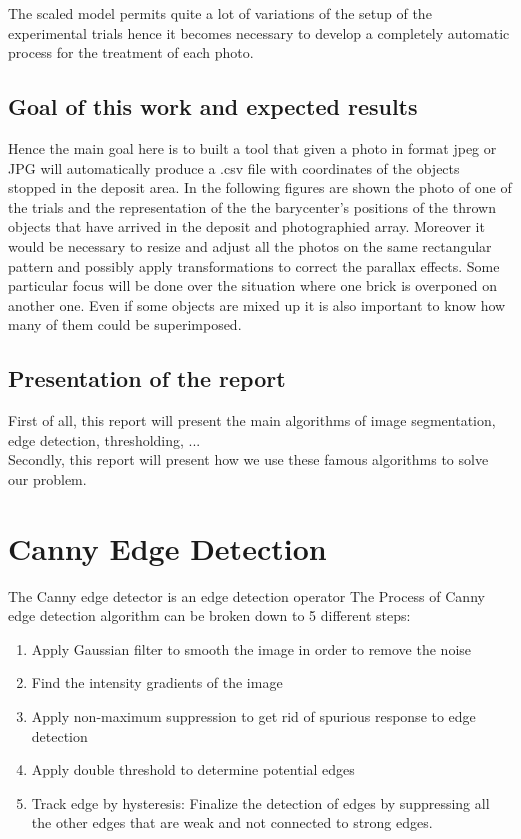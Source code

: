 \documentclass{article}
\begin{document}
The scaled model permits quite a lot of variations of the setup of the experimental
trials hence it becomes necessary to develop a completely automatic process for the treatment of each photo.

\subsection{Goal of this work and expected results}

Hence the main goal here is to built a tool that given a photo in format jpeg or
JPG will automatically produce a .csv file with coordinates of the objects stopped in the
deposit area.
In the following figures are shown the photo of one of the trials and the representation
of the the barycenter’s positions of the thrown objects that have arrived in the deposit
and photographied array.
Moreover it would be necessary to resize and adjust all the photos on the same rectangular pattern and possibly apply transformations to correct the parallax effects.
Some particular focus will be done over the situation where one brick is overponed on
another one. Even if some objects are mixed up it is also important to know how many
of them could be superimposed.

\subsection{Presentation of the report}

First of all, this report will present the main algorithms of image segmentation, edge detection, thresholding, ...\\
Secondly, this report will present how we use these famous algorithms to solve our problem. 

\section{Canny Edge Detection}



The Canny edge detector is an edge detection operator
The Process of Canny edge detection algorithm can be broken down to 5 different steps:

\begin{enumerate}
	\item Apply Gaussian filter to smooth the image in order to remove the noise
	\item Find the intensity gradients of the image
	\item Apply non-maximum suppression to get rid of spurious response to edge detection
	\item Apply double threshold to determine potential edges
	\item Track edge by hysteresis: Finalize the detection of edges by suppressing all the other edges that are weak and not connected to strong edges.
\end{enumerate}
\vspace{1 cm}
\end{document}
